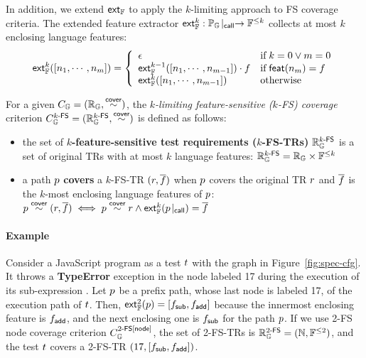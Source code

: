 In addition, we extend $\textsf{ext}_{\mathbb{F}}$ to apply the $k$-limiting approach to FS coverage
criteria. The extended feature extractor $\textsf{ext}_{\mathbb{F}}^{k}: {\mathbb{P}_{\mathbb{G}}}\!\mid_{\textsf{call}}
\rightarrow \mathbb{F}^{\leq k}$ collects at most $k$ enclosing language features:
%
\begin{equation}\label{equ:extfeats}
  \textsf{ext}_{\mathbb{F}}^{k}([n_1, \cdots, n_m]) = \left\{
    \begin{array}{ll}
      \epsilon & \text{if} \; k = 0 \vee m = 0\\

      \textsf{ext}_{\mathbb{F}}^{k-1}([n_1, \cdots, n_{m-1}]) \cdot f & \text{if} \;
      \textsf{feat}(n_m) = f\\

      \textsf{ext}_{\mathbb{F}}^{k}([n_1, \cdots, n_{m-1}]) & \text{otherwise}\\
    \end{array}
  \right.
\end{equation}


\begin{definition}\label{def:k-fs-cov}
  For a given $C_{\mathbb{G}} = (\mathbb{R}_{\mathbb{G}}, \overset{\textsf{cover}}{\sim})$, the
  \textit{$k$-limiting feature-sensitive ($k$-FS) coverage} criterion
  $C_{\mathbb{G}}^{{k}\textsf{-FS}} = (\mathbb{R}_{\mathbb{G}}^{{k}\textsf{-FS}}, \overset{\textsf{cover}}{\sim})$ is defined as follows:
  \begin{itemize}
    \item the set of \textbf{$k$-feature-sensitive test requirements
      ($k$-FS-TRs)} $\mathbb{R}_{\mathbb{G}}^{{k}\textsf{-FS}}$ is a set of original TRs with at most
      $k$ language features:
$
        \mathbb{R}_{\mathbb{G}}^{{k}\textsf{-FS}} = \mathbb{R}_{\mathbb{G}} \times \mathbb{F}^{\leq k}
$
    \item a path $p$ \textbf{covers} a $k$-FS-TR $(r, \overline{f})$ when $p$
      covers the original TR $r$ and $\overline{f}$ is the $k$-most enclosing
      language features of $p$:
$
        p \overset{\textsf{cover}}{\sim} (r, \overline{f}) \iff p \overset{\textsf{cover}}{\sim} r \wedge
        \textsf{ext}_{\mathbb{F}}^{k}({p}\!\mid_{\textsf{call}}) = \overline{f}
$
  \end{itemize}
\end{definition}


\paragraph{\textbf{Example}}
%
Consider a JavaScript program  as a test $t$ with the
graph in Figure~\ref{fig:spec-cfg}.
%
It throws a \textbf{TypeError} exception in the node labeled 17 during the execution
of its sub-expression .
%
Let $p$ be a prefix path, whose last node is labeled 17, of the execution path
of $t$.
%
Then, $\textsf{ext}_{\mathbb{F}}^{2}(p) = [f_{\textsf{sub}}, f_{\textsf{add}}]$ because the innermost enclosing
feature is $f_{\textsf{add}}$, and the next enclosing one is $f_{\textsf{sub}}$ for the
path $p$.
%
If we use 2-FS node coverage criterion $C_{\mathbb{G}}^{{2}\textsf{-FS}[\textsf{node}]}$, the set of
2-FS-TRs is $\mathbb{R}_{\mathbb{G}}^{{2}\textsf{-FS}} = (\mathbb{N}, \mathbb{F}^{\leq 2})$, and the test
$t$ covers a 2-FS-TR $(17, [f_{\textsf{sub}}, f_{\textsf{add}}])$.

